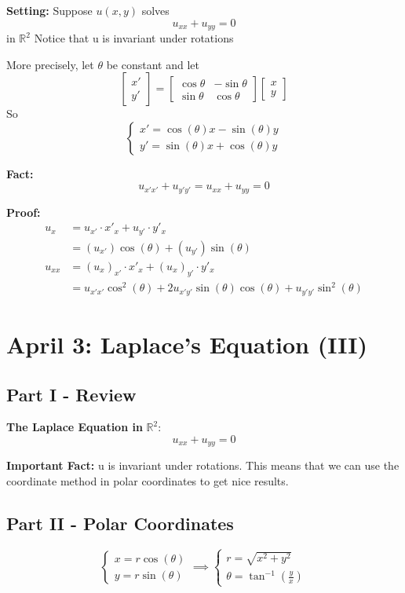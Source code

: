 \documentclass[12pt]{article}
\begin{document}
\textbf{Setting:} Suppose $u(x, y)$ solves 
\[u_{xx} + u_{yy} = 0\] 
in $\mathbb{R}^2$
Notice that u is invariant under rotations

More precisely, let $\theta$ be constant and let 
\[\begin{bmatrix}
    x'\\
    y'
\end{bmatrix} = \begin{bmatrix}
    \cos \theta & -\sin \theta\\
    \sin \theta & \cos \theta      
\end{bmatrix} \begin{bmatrix}
    x\\y
\end{bmatrix}\]
So
\[\begin{cases}
    x' = \cos(\theta) x - \sin(\theta)y\\
    y' = \sin(\theta)x + \cos(\theta) y 
\end{cases}\]

\textbf{Fact:}
\[u_{x'x'} + u_{y'y'} = u_{xx} + u_{yy} = 0\]

\textbf{Proof:}
\begin{align*}
    u_x &= u_{x'} \cdot x'_x + u_{y'}\cdot  y'_x\\
    &= (u_{x'})\cos(\theta) + (u_{y'})\sin(\theta)\\
    u_{xx} &= (u_x)_{x'} \cdot x'_x + (u_x)_{y'} \cdot y'_x\\
    &= u_{x'x'} \cos^2(\theta) + 2u_{x'y'}\sin(\theta) \cos(\theta) + u_{y'y'}\sin^2(\theta )
\end{align*}

\section{April 3: Laplace's Equation (III)}
\subsection*{Part I - Review}
\textbf{The Laplace Equation in} $\mathbb{R}^2$:
\[u_{xx} + u_{yy} = 0\]

\textbf{Important Fact:} u is invariant under rotations. This means that we can use the coordinate method in polar coordinates to get nice results. 

\subsection*{Part II - Polar Coordinates}
\[\begin{cases}
    x = r\cos(\theta)\\
    y= r\sin(\theta) 
\end{cases} \implies \begin{cases}
    r = \sqrt{x^2 + y^2}\\
    \theta = \tan^{-1}(\frac{y}{x})
\end{cases}\]
\end{document}
